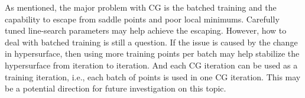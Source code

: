 As mentioned, the major problem with CG is the batched training and the capability to escape from saddle points and poor local minimums.
Carefully tuned line-search parameters may help achieve the escaping.
However, how to deal with batched training is still a question.
If the issue is caused by the change in hypersurface, then using more training points per batch may help stabilize the hypersurface from iteration to iteration.
And each CG iteration can be used as a training iteration, i.e., each batch of points is used in one CG iteration.
This may be a potential direction for future investigation on this topic.
